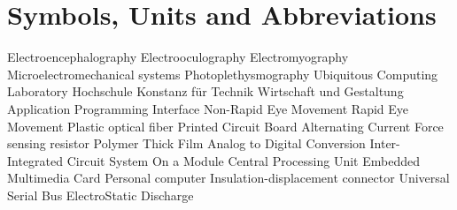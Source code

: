 \chapter*{Symbols, Units and Abbreviations}

\begin{acronym}
   {Electroencephalography}
   {Electrooculography}
   {Electromyography}
   {Microelectromechanical systems}
   {Photoplethysmography}
   {Ubiquitous Computing Laboratory}
   {Hochschule Konstanz f\"ur Technik Wirtschaft und Gestaltung}
   {Application Programming Interface}
   {Non-Rapid Eye Movement}
   {Rapid Eye Movement}
   {Plastic optical fiber}
   {Printed Circuit Board}
   {Alternating Current}
   {Force sensing resistor}
   {Polymer Thick Film}
   {Analog to Digital Conversion}
   {Inter-Integrated Circuit}
   {System On a Module}
   {Central Processing Unit}
   {Embedded Multimedia Card}
   {Personal computer}
   {Insulation-displacement connector}
   {Universal Serial Bus}
   {ElectroStatic Discharge}
\end{acronym}

\newpage